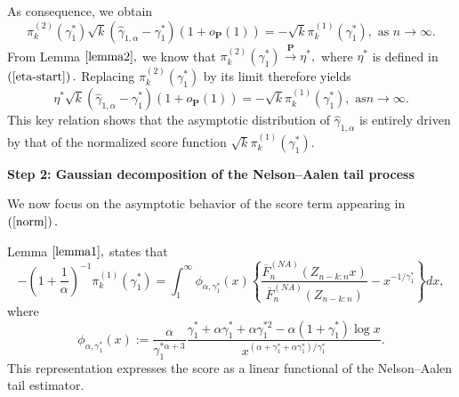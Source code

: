 \documentclass[reqno,openbib,runningheads,a4paper,12pt]{amsart}%
\begin{document}
\noindent As consequence, we obtain
\[
\pi_{k}^{\left(  2\right)  }\left(  \gamma_{1}^{\ast}\right)  \sqrt{k}\left(
\widehat{\gamma}_{1,\alpha}-\gamma_{1}^{\ast}\right)  \left(  1+o_{\mathbf{P}%
}\left(  1\right)  \right)  =-\sqrt{k}\pi_{k}^{\left(  1\right)  }\left(
\gamma_{1}^{\ast}\right)  ,\text{ as }n\rightarrow\infty.
\]
From Lemma $\ref{lemma2},$ we know that $\pi_{k}^{\left(  2\right)  }\left(
\gamma_{1}^{\ast}\right)  \overset{\mathbf{P}}{\rightarrow}\eta^{\ast},$ where
$\eta^{\ast}$ is defined in $\left(  \ref{eta-start}\right)  .$ Replacing
$\pi_{k}^{\left(  2\right)  }\left(  \gamma_{1}^{\ast}\right)  $ by its limit
therefore yields
\begin{equation}
\eta^{\ast}\sqrt{k}\left(  \widehat{\gamma}_{1,\alpha}-\gamma_{1}^{\ast
}\right)  \left(  1+o_{\mathbf{P}}\left(  1\right)  \right)  =-\sqrt{k}\pi
_{k}^{\left(  1\right)  }\left(  \gamma_{1}^{\ast}\right)  ,\text{ as
}n\rightarrow\infty. \label{norm}%
\end{equation}
This key relation shows that the asymptotic distribution of $\widehat{\gamma
}_{1,\alpha}$ is entirely driven by that of the normalized score function
$\sqrt{k}\pi_{k}^{\left(  1\right)  }\left(  \gamma_{1}^{\ast}\right)
.$\textbf{\medskip}

\noindent\textbf{Step 2: Gaussian decomposition of the Nelson--Aalen tail
process\medskip}

\noindent We now focus on the asymptotic behavior of the score term appearing
in $\left(  \ref{norm}\right)  .$\textbf{\medskip}

\noindent Lemma $\ref{lemma1},$ states that
\[
-\left(  1+\frac{1}{\alpha}\right)  ^{-1}\pi_{k}^{\left(  1\right)  }\left(
\gamma_{1}^{\ast}\right)  =\int_{1}^{\infty}\phi_{\alpha,\gamma_{1}^{\ast}%
}\left(  x\right)  \left\{  \frac{\overline{F}_{n}^{\left(  NA\right)
}\left(  Z_{n-k:n}x\right)  }{\overline{F}_{n}^{\left(  NA\right)  }\left(
Z_{n-k:n}\right)  }-x^{-1/\gamma_{1}^{\ast}}\right\}  dx,
\]
where
\begin{equation}
\phi_{\alpha,\gamma_{1}^{\ast}}\left(  x\right)  :=\frac{\alpha}{\gamma
_{1}^{\ast\alpha+3}}\frac{\gamma_{1}^{\ast}+\alpha\gamma_{1}^{\ast}%
+\alpha\gamma_{1}^{\ast2}-\alpha\left(  1+\gamma_{1}^{\ast}\right)  \log
x}{x^{\left(  \alpha+\gamma_{1}^{\ast}+\alpha\gamma_{1}^{\ast}\right)
/\gamma_{1}^{\ast}}}.\label{phi}%
\end{equation}
This representation expresses the score as a linear functional of the
Nelson--Aalen tail estimator.\textbf{\medskip}
\end{document}
